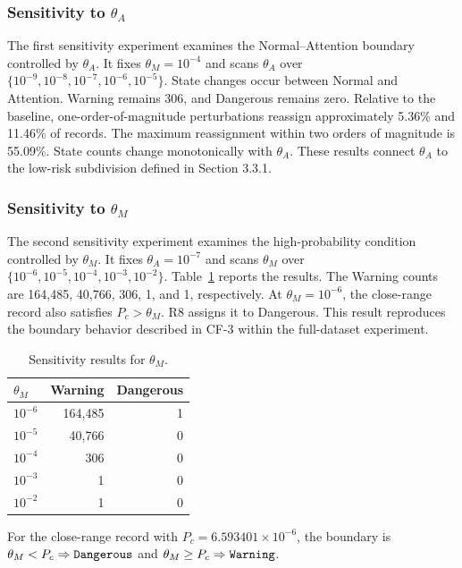 \documentclass[Royal,sageh,times]{sagej}
\newcommand{\ontm}[1]{\text{\normalfont\ttfamily\upshape #1}}
\begin{document}
\subsubsection[Theta-A sensitivity]{Sensitivity to $\theta_A$}

The first sensitivity experiment examines the Normal--Attention boundary controlled by $\theta_A$. It fixes $\theta_M=10^{-4}$ and scans $\theta_A$ over $\{10^{-9},10^{-8},10^{-7},10^{-6},10^{-5}\}$. State changes occur between Normal and Attention. Warning remains 306, and Dangerous remains zero. Relative to the baseline, one-order-of-magnitude perturbations reassign approximately 5.36\% and 11.46\% of records. The maximum reassignment within two orders of magnitude is 55.09\%. State counts change monotonically with $\theta_A$. These results connect $\theta_A$ to the low-risk subdivision defined in Section 3.3.1.

\subsubsection[Theta-M sensitivity]{Sensitivity to $\theta_M$}

The second sensitivity experiment examines the high-probability condition controlled by $\theta_M$. It fixes $\theta_A=10^{-7}$ and scans $\theta_M$ over $\{10^{-6},10^{-5},10^{-4},10^{-3},10^{-2}\}$. Table~\ref{tab:theta-m-sensitivity} reports the results. The Warning counts are 164,485, 40,766, 306, 1, and 1, respectively. At $\theta_M=10^{-6}$, the close-range record also satisfies $P_c>\theta_M$. R8 assigns it to Dangerous. This result reproduces the boundary behavior described in CF-3 within the full-dataset experiment.
\begin{table}[!htbp]
  \centering
  \caption{Sensitivity results for $\theta_M$.}
  \label{tab:theta-m-sensitivity}
  \footnotesize
  \begin{tabular}{lrr}
    \toprule
    $\theta_M$ & \textbf{Warning} & \textbf{Dangerous} \\
    \midrule
    $10^{-6}$ & 164,485 & 1 \\
    $10^{-5}$ & 40,766 & 0 \\
    $10^{-4}$ & 306 & 0 \\
    $10^{-3}$ & 1 & 0 \\
    $10^{-2}$ & 1 & 0 \\
    \bottomrule
  \end{tabular}
\end{table}
For the close-range record with $P_c=6.593401\times10^{-6}$, the boundary is $\theta_M<P_c\Rightarrow\ontm{Dangerous}$ and $\theta_M\geq P_c\Rightarrow\ontm{Warning}$.
\end{document}
